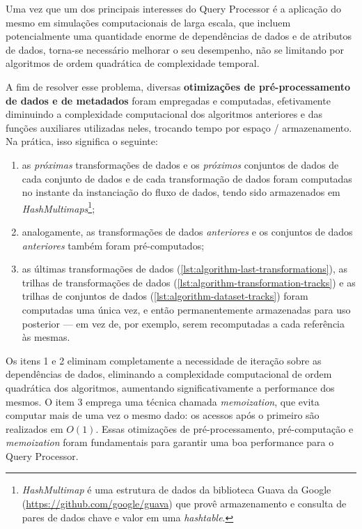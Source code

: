 Uma vez que um dos principais interesses do Query Processor é a aplicação do mesmo em simulações computacionais de larga escala, que incluem potencialmente uma quantidade enorme de dependências de dados e de atributos de dados, torna-se necessário melhorar o seu desempenho, não se limitando por algoritmos de ordem quadrática de complexidade temporal.

A fim de resolver esse problema, diversas \textbf{otimizações de pré-processamento de dados e de metadados} foram empregadas e computadas, efetivamente diminuindo a complexidade computacional dos algoritmos anteriores e das funções auxiliares utilizadas neles, trocando tempo por espaço / armazenamento. Na prática, isso significa o seguinte:

\begin{enumerate}
    \item as \emph{próximas} transformações de dados e os \emph{próximos} conjuntos de dados de cada conjunto de dados e de cada transformação de dados foram computadas no instante da instanciação do fluxo de dados, tendo sido armazenados em \textit{HashMultimaps}\footnote{\textit{HashMultimap} é uma estrutura de dados da biblioteca Guava da Google (\url{https://github.com/google/guava}) que provê armazenamento e consulta de pares de dados chave e valor em uma \textit{hashtable}.};
    \item analogamente, as transformações de dados \emph{anteriores} e os conjuntos de dados \emph{anteriores} também foram pré-computados;
    \item as últimas transformações de dados (\autoref{lst:algorithm-last-transformations}), as trilhas de transformações de dados (\autoref{lst:algorithm-transformation-tracks}) e as trilhas de conjuntos de dados (\autoref{lst:algorithm-dataset-tracks}) foram computadas uma única vez, e então permanentemente armazenadas para uso posterior --- em vez de, por exemplo, serem recomputadas a cada referência às mesmas.
\end{enumerate}

Os itens 1 e 2 eliminam completamente a necessidade de iteração sobre as dependências de dados, eliminando a complexidade computacional de ordem quadrática dos algoritmos, aumentando significativamente a performance dos mesmos. O item 3 emprega uma técnica chamada \textit{memoization}, que evita computar mais de uma vez o mesmo dado: os acessos após o primeiro são realizados em \(O(1)\). Essas otimizações de pré-processamento, pré-computação e \textit{memoization} foram fundamentais para garantir uma boa performance para o Query Processor.


